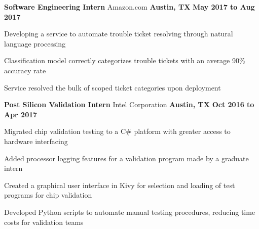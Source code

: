   \begin{cventries}
    \cventry
      {\normalsize \textbf{Software Engineering Intern}}
      {\large Amazon.com}
      {\normalsize \textbf{Austin, TX}}
      {\normalsize \textbf{May 2017 to Aug 2017}}
      {
        \begin{cvitems}
          \item {\normalsize Developing a service to automate trouble ticket resolving through natural language processing}
          \item {\normalsize Classification model correctly categorizes trouble tickets with an average 90\% accuracy rate}
          \item {\normalsize Service resolved the bulk of scoped ticket categories upon deployment}
        \end{cvitems}
      }
    \cventry
      {\normalsize \textbf{Post Silicon Validation Intern}}
      {\large Intel Corporation}
      {\normalsize \textbf{Austin, TX}}
      {\normalsize \textbf{Oct 2016 to Apr 2017}}
      {
        \begin{cvitems}
          \item {\normalsize Migrated chip validation testing to a C\# platform with greater access to hardware interfacing} 
          \item {\normalsize Added processor logging features for a validation program made by a graduate intern}
          \item {\normalsize Created a graphical user interface in Kivy for selection and loading of test programs for chip validation}
          \item {\normalsize Developed Python scripts to automate manual testing procedures, reducing time costs for validation teams}
        \end{cvitems}
      }
  \end{cventries}
